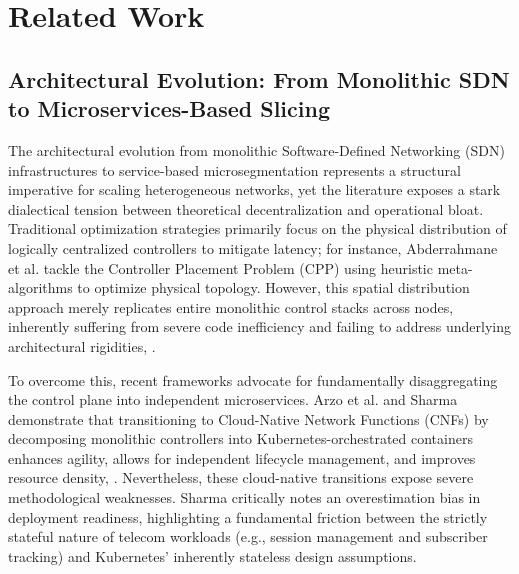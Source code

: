 \documentclass[conference]{IEEEtran}
\begin{document}
\section{Related Work}\label{sec:related}

\subsection{Architectural Evolution: From Monolithic SDN to Microservices-Based Slicing}\label{sec:rw-arch}

The architectural evolution from monolithic Software-Defined Networking (SDN) infrastructures to service-based microsegmentation represents a structural imperative for scaling heterogeneous networks, yet the literature exposes a stark dialectical tension between theoretical decentralization and operational bloat. Traditional optimization strategies primarily focus on the physical distribution of logically centralized controllers to mitigate latency; for instance, Abderrahmane et al. tackle the Controller Placement Problem (CPP) using heuristic meta-algorithms to optimize physical topology\cite{b19}. However, this spatial distribution approach merely replicates entire monolithic control stacks across nodes, inherently suffering from severe code inefficiency and failing to address underlying architectural rigidities\cite{b8}, \cite{b19}.

To overcome this, recent frameworks advocate for fundamentally disaggregating the control plane into independent microservices. Arzo et al. and Sharma demonstrate that transitioning to Cloud-Native Network Functions (CNFs) by decomposing monolithic controllers into Kubernetes-orchestrated containers enhances agility, allows for independent lifecycle management, and improves resource density\cite{b8}, \cite{b10}. Nevertheless, these cloud-native transitions expose severe methodological weaknesses. Sharma critically notes an overestimation bias in deployment readiness, highlighting a fundamental friction between the strictly stateful nature of telecom workloads (e.g., session management and subscriber tracking) and Kubernetes' inherently stateless design assumptions\cite{b10}.
\end{document}
